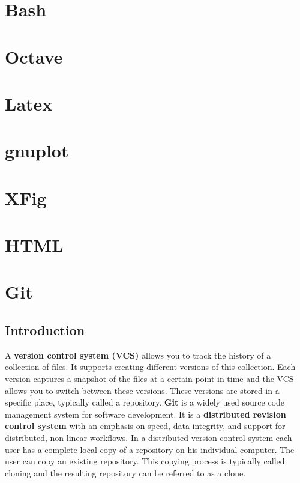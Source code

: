 \documentclass{article}
\author{}
\date{}
\begin{document}
\maketitle

\section{Bash}
\section{Octave}
\section{Latex}
\section{gnuplot}
\section{XFig}
\section{HTML}
\section{Git}
    \subsection{Introduction}
    A \textbf{version control system (VCS)} allows you to track the history of a collection of files. It supports creating different versions of this collection. Each version captures a snapshot of the files at a certain point in time and the VCS allows you to switch between these versions. These versions are stored in a specific place, typically called a repository.
    \textbf{Git} is a widely used source code management system for software development. It is a \textbf{distributed revision control system} with an emphasis on speed, data integrity, and support for distributed, non-linear workflows. In a distributed version control system each user has a complete local copy of a repository on his individual computer. The user can copy an existing repository. This copying process is typically called cloning and the resulting repository can be referred to as a clone.
    
\end{document}

